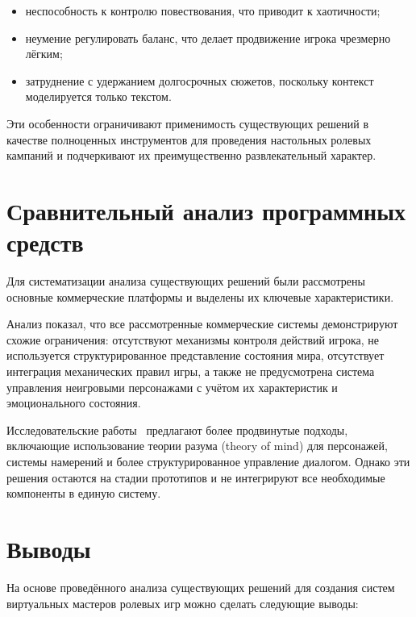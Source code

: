 \begin{itemize}
	\item неспособность к контролю повествования, что приводит к хаотичности;
	\item неумение регулировать баланс, что делает продвижение игрока чрезмерно лёгким;
	\item затруднение с удержанием долгосрочных сюжетов, поскольку контекст моделируется только текстом.
\end{itemize}

Эти особенности ограничивают применимость существующих решений в качестве полноценных инструментов для проведения настольных ролевых кампаний и подчеркивают их преимущественно развлекательный характер.






\section{Сравнительный анализ программных средств}

Для систематизации анализа существующих решений были рассмотрены основные коммерческие платформы и выделены их ключевые характеристики.

Анализ показал, что все рассмотренные коммерческие системы демонстрируют схожие ограничения: отсутствуют механизмы контроля действий игрока, не используется структурированное представление состояния мира, отсутствует интеграция механических правил игры, а также не предусмотрена система управления неигровыми персонажами с учётом их характеристик и эмоционального состояния.

Исследовательские работы~\cite{Zhou2022,Zhu2023,CallisonBurch2022} предлагают более продвинутые подходы, включающие использование теории разума (theory of mind) для персонажей, системы намерений и более структурированное управление диалогом. Однако эти решения остаются на стадии прототипов и не интегрируют все необходимые компоненты в единую систему.




\section{Выводы}

На основе проведённого анализа существующих решений для создания систем виртуальных мастеров ролевых игр можно сделать следующие выводы:

